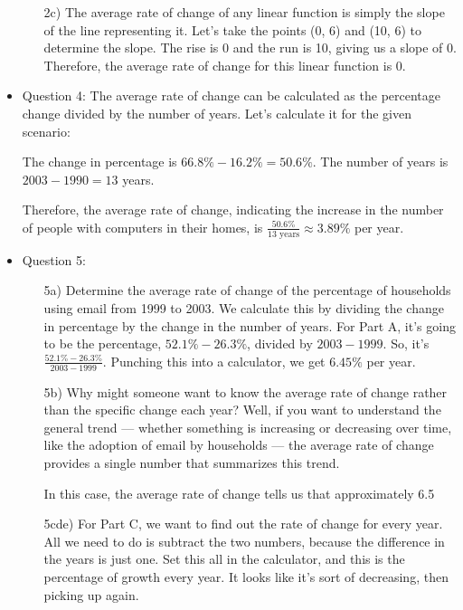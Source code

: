 \documentclass{article}
\begin{document}
\begin{itemize}
\begin{enumerate}
    \item[2c)] The average rate of change of any linear function is simply the slope of the line representing it. Let's take the points (0, 6) and (10, 6) to determine the slope. The rise is 0 and the run is 10, giving us a slope of 0. Therefore, the average rate of change for this linear function is 0.
\end{enumerate}

\item Question 4:
The average rate of change can be calculated as the percentage change divided by the number of years. Let's calculate it for the given scenario:

The change in percentage is $66.8\% - 16.2\% = 50.6\%$. The number of years is $2003 - 1990 = 13$ years.

Therefore, the average rate of change, indicating the increase in the number of people with computers in their homes, is $\frac{50.6\%}{13 \text{ years}} \approx 3.89\%$ per year.

\item Question 5:
\begin{enumerate}
    \item[5a)] Determine the average rate of change of the percentage of households using email from 1999 to 2003. We calculate this by dividing the change in percentage by the change in the number of years. For Part A, it's going to be the percentage, $52.1\% - 26.3\%$, divided by $2003 - 1999$. So, it's $ \frac{52.1\% - 26.3\%}{2003 - 1999}$. Punching this into a calculator, we get $6.45\%$ per year. 
    \item[5b)] Why might someone want to know the average rate of change rather than the specific change each year? Well, if you want to understand the general trend — whether something is increasing or decreasing over time, like the adoption of email by households — the average rate of change provides a single number that summarizes this trend. 

In this case, the average rate of change tells us that approximately 6.5 %
    \item[5cde)] For Part C, we want to find out the rate of change for every year. All we need to do is subtract the two numbers, because the difference in the years is just one. Set this all in the calculator, and this is the percentage of growth every year. It looks like it's sort of decreasing, then picking up again.


\end{enumerate}
\end{itemize}
\end{document}
